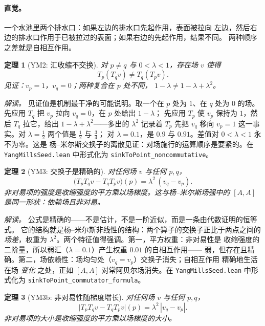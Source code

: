 \documentclass[aps,prd,preprint,superscriptaddress,amsmath,amssymb]{revtex4-2}
\newtheorem{theorem}{定理}[section]
\begin{document}
\paragraph{直觉。} 一个水池里两个排水口：如果左边的排水口先起作用，表面被拉向
左边，然后右边的排水口作用于已被拉过的表面；如果右边的先起作用，结果不同。
两种顺序之差就是自相互作用。

\begin{theorem}[YM2: 汇收缩不交换]
\label{thm:ym2}
对 $p\neq q$ 与 $0<\lambda<1$，存在场 $v$ 使得
\begin{equation}
T_p(T_q v)\neq T_q(T_p v).
\end{equation}
见证：$v_p=1$，$v_q=0$；两种复合在 $p$ 处不同，
$1-\lambda\neq 1-\lambda+\lambda^2$。
\end{theorem}

\emph{解读。} 见证值是机制最干净的可能说明。取一个在 $p$ 处为 $1$、在 $q$ 处为
$0$ 的场。先应用 $T_q$ 把 $v_p$ 拉向 $v_q=0$，在 $p$ 处给出 $1-\lambda$；
先应用 $T_p$ 使 $v_p$ 保持为 $1$，然后 $T_q$ 拉它，给出
$1-\lambda+\lambda^2$——多出的 $\lambda^2$ 记录着 $T_p$ 先把 $v_q$ 移向
$v_p=1$ 这一事实。对 $\lambda=\tfrac12$ 两个值是 $\tfrac12$ 与 $\tfrac34$；
对 $\lambda=0.1$，是 $0.9$ 与 $0.91$。差值对 $0<\lambda<1$ 永不为零。这是
杨--米尔斯交换子的离散见证：对场施行的运算顺序是要紧的。在
\texttt{YangMillsSeed.lean} 中形式化为 \texttt{sinkToPoint\_noncommutative}。

\begin{theorem}[YM3: 交换子是精确的]
\label{thm:ym3}
对任何场 $v$ 与任何 $p,q$，
\begin{equation}
\bigl(T_p T_q v - T_q T_p v\bigr)(p) = \lambda^2\,(v_q-v_p).
\end{equation}
非对易项的强度是收缩强度的平方乘以场梯度。这与杨--米尔斯场强中的 $[A,A]$
是同一形状：依赖场且非对易。
\end{theorem}

\emph{解读。} 公式是精确的——不是估计，不是一阶近似，而是一条由代数证明的恒等式。
它的结构就是杨--米尔斯非线性的结构：两个算子的交换子正比于两点之间的
\emph{场差}，权重为 $\lambda^2$。两个特征值得强调。第一，平方权重：非对易性是
收缩强度的二阶量，所以弱汇（$\lambda=0.1$）产生权重 $0.01$ 的自相互作用——
弱，但存在且精确。第二，场依赖性：场均匀处（$v_q=v_p$）交换子消失；自相互作用
精确地生活在场 \emph{变化} 之处，正如 $[A,A]$ 对常阿贝尔场消失。在
\texttt{YangMillsSeed.lean} 中形式化为 \texttt{sinkToPoint\_commutator\_formula}。

\begin{theorem}[YM3b: 非对易性随梯度增长]
\label{thm:ym3b}
对任何场 $v$ 与任何 $p,q$，
\begin{equation}
\bigl|T_p T_q v - T_q T_p v\bigr|(p) = \lambda^2\,|v_q-v_p|.
\end{equation}
非对易项的大小是收缩强度的平方乘以场梯度的大小。
\end{theorem}
\end{document}
